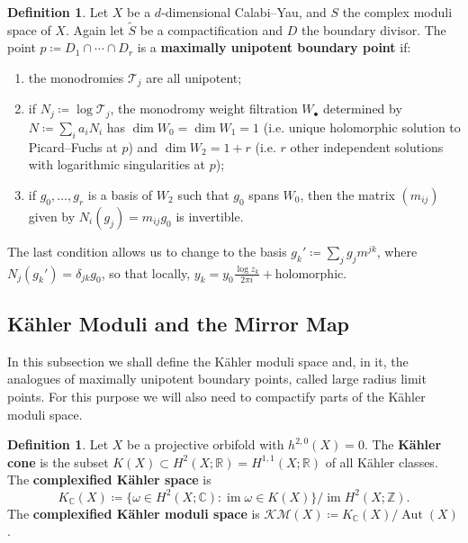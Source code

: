 \documentclass{report}
\theoremstyle{plain}
\theoremstyle{definition}
\newtheorem{definition}[theorem]{Definition}
\theoremstyle{remark}
\newcommand{\bC}{\mathbb{C}}
\newcommand{\bR}{\mathbb{R}}
\newcommand{\bZ}{\mathbb{Z}}
\newcommand{\cT}{\mathcal{T}}
\newcommand{\cKM}{\mathcal{KM}}
\DeclareMathOperator{\im}{im}
\DeclareMathOperator{\Aut}{Aut}
\begin{document}
\begin{definition} \label{def:maximally-unipotent-boundary-point}
  Let $X$ be a $d$-dimensional Calabi--Yau, and $S$ the complex moduli
  space of $X$. Again let $\tilde S$ be a compactification and $D$ the
  boundary divisor. The point $p \coloneqq D_1 \cap \cdots \cap D_r$
  is a {\bf maximally unipotent boundary point} if:
  \begin{enumerate}
  \item the monodromies $\cT_j$ are all unipotent;
  \item if $N_j \coloneqq \log \cT_j$, the monodromy weight filtration
    $W_\bullet$ determined by $N \coloneqq \sum_i a_i N_i$ has $\dim
    W_0 = \dim W_1 = 1$ (i.e. unique holomorphic solution to
    Picard--Fuchs at $p$) and $\dim W_2 = 1 + r$ (i.e. $r$ other
    independent solutions with logarithmic singularities at $p$);
  \item if $g_0, \ldots, g_r$ is a basis of $W_2$ such that $g_0$
    spans $W_0$, then the matrix $(m_{ij})$ given by $N_i(g_j) =
    m_{ij}g_0$ is invertible.
  \end{enumerate}
  The last condition allows us to change to the basis $g_k' \coloneqq
  \sum_j g_j m^{jk}$, where $N_j(g_k') = \delta_{jk} g_0$, so that
  locally, $y_k = y_0 \frac{\log z_k}{2\pi i} + \text{holomorphic}$.
\end{definition}

\subsection{K\"ahler Moduli and the Mirror Map}

In this subsection we shall define the K\"ahler moduli space and, in
it, the analogues of maximally unipotent boundary points, called large
radius limit points. For this purpose we will also need to compactify
parts of the K\"ahler moduli space.

\begin{definition}
  Let $X$ be a projective orbifold with $h^{2,0}(X) = 0$. The {\bf
    K\"ahler cone} is the subset $K(X) \subset H^2(X; \bR) =
  H^{1,1}(X; \bR)$ of all K\"ahler classes. The {\bf complexified
    K\"ahler space} is
  \[ K_{\bC}(X) \coloneqq \{\omega \in H^2(X; \bC) : \im \omega \in K(X)\}/\im H^2(X; \bZ). \]
  The {\bf complexified K\"ahler moduli space} is
  $\cKM(X) \coloneqq K_{\bC}(X)/\Aut(X)$.
\end{definition}
\end{document}
